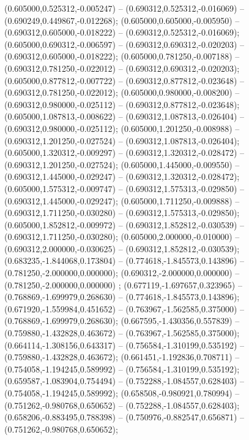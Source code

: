  (0.605000,0.525312,-0.005247) -- (0.690312,0.525312,-0.016069) -- (0.690249,0.449867,-0.012268);
 (0.605000,0.605000,-0.005950) -- (0.690312,0.605000,-0.018222) -- (0.690312,0.525312,-0.016069);
 (0.605000,0.690312,-0.006597) -- (0.690312,0.690312,-0.020203) -- (0.690312,0.605000,-0.018222);
 (0.605000,0.781250,-0.007188) -- (0.690312,0.781250,-0.022012) -- (0.690312,0.690312,-0.020203);
 (0.605000,0.877812,-0.007722) -- (0.690312,0.877812,-0.023648) -- (0.690312,0.781250,-0.022012);
 (0.605000,0.980000,-0.008200) -- (0.690312,0.980000,-0.025112) -- (0.690312,0.877812,-0.023648);
 (0.605000,1.087813,-0.008622) -- (0.690312,1.087813,-0.026404) -- (0.690312,0.980000,-0.025112);
 (0.605000,1.201250,-0.008988) -- (0.690312,1.201250,-0.027524) -- (0.690312,1.087813,-0.026404);
 (0.605000,1.320312,-0.009297) -- (0.690312,1.320312,-0.028472) -- (0.690312,1.201250,-0.027524);
 (0.605000,1.445000,-0.009550) -- (0.690312,1.445000,-0.029247) -- (0.690312,1.320312,-0.028472);
 (0.605000,1.575312,-0.009747) -- (0.690312,1.575313,-0.029850) -- (0.690312,1.445000,-0.029247);
 (0.605000,1.711250,-0.009888) -- (0.690312,1.711250,-0.030280) -- (0.690312,1.575313,-0.029850);
 (0.605000,1.852812,-0.009972) -- (0.690312,1.852812,-0.030539) -- (0.690312,1.711250,-0.030280);
 (0.605000,2.000000,-0.010000) -- (0.690312,2.000000,-0.030625) -- (0.690312,1.852812,-0.030539);
 (0.683235,-1.844068,0.173804) -- (0.774618,-1.845573,0.143896) -- (0.781250,-2.000000,0.000000);
 (0.690312,-2.000000,0.000000) -- (0.781250,-2.000000,0.000000) ;
 (0.677119,-1.697657,0.323965) -- (0.768869,-1.699979,0.268630) -- (0.774618,-1.845573,0.143896);
 (0.671920,-1.559984,0.451652) -- (0.763967,-1.562585,0.375000) -- (0.768869,-1.699979,0.268630);
 (0.667595,-1.430356,0.557839) -- (0.759880,-1.432828,0.463672) -- (0.763967,-1.562585,0.375000);
 (0.664114,-1.308156,0.643317) -- (0.756584,-1.310199,0.535192) -- (0.759880,-1.432828,0.463672);
 (0.661451,-1.192836,0.708711) -- (0.754058,-1.194245,0.589992) -- (0.756584,-1.310199,0.535192);
 (0.659587,-1.083904,0.754494) -- (0.752288,-1.084557,0.628403) -- (0.754058,-1.194245,0.589992);
 (0.658508,-0.980921,0.780994) -- (0.751262,-0.980768,0.650652) -- (0.752288,-1.084557,0.628403);
 (0.658206,-0.883495,0.788398) -- (0.750976,-0.882547,0.656871) -- (0.751262,-0.980768,0.650652);
